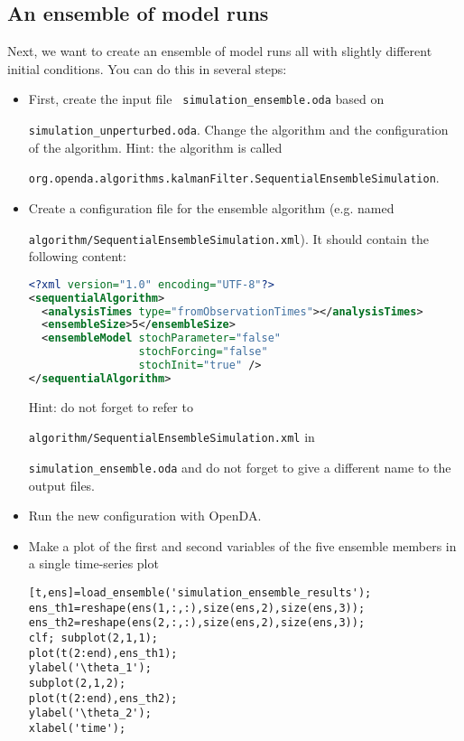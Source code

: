 \subsection{An ensemble of model runs}
Next, we want to create an ensemble of model runs all with slightly different initial conditions. 
      You can do this in several steps:
      \begin{itemize}
      \item First, create the input file \texttt{ simulation\_ensemble.oda} based on

            \texttt{simulation\_unperturbed.oda}. Change the algorithm and the
            configuration of the algorithm. Hint: the algorithm is called

            \verb|org.openda.algorithms.kalmanFilter.SequentialEnsembleSimulation|.
      \item Create a configuration file for the ensemble algorithm (e.g. named

            \texttt{algorithm/SequentialEnsembleSimulation.xml}). It should contain the following content:
\begin{lstlisting}[language=XML,frame=single,caption={XML input for sequentialAlgorithm}]
<?xml version="1.0" encoding="UTF-8"?>
<sequentialAlgorithm>
  <analysisTimes type="fromObservationTimes"></analysisTimes>
  <ensembleSize>5</ensembleSize>
  <ensembleModel stochParameter="false"
                 stochForcing="false"
                 stochInit="true" />
</sequentialAlgorithm>

\end{lstlisting}
      Hint: do not forget to refer to 

      \texttt{algorithm/SequentialEnsembleSimulation.xml} in 

      \texttt{simulation\_ensemble.oda}
      and do not forget to give a different name to the output files.
      \item Run the new configuration with OpenDA.

      \item Make a plot of the first and second variables of the five ensemble
      members in a single time-series plot
\ifshowmatlab
\begin{lstlisting}[style=MatlabStyle,frame=single,caption={Matlab}]
[t,ens]=load_ensemble('simulation_ensemble_results');
ens_th1=reshape(ens(1,:,:),size(ens,2),size(ens,3));
ens_th2=reshape(ens(2,:,:),size(ens,2),size(ens,3));
clf; subplot(2,1,1);
plot(t(2:end),ens_th1);
ylabel('\theta_1');
subplot(2,1,2);
plot(t(2:end),ens_th2);
ylabel('\theta_2');
xlabel('time');\end{lstlisting}
\fi
     

\end{itemize}
